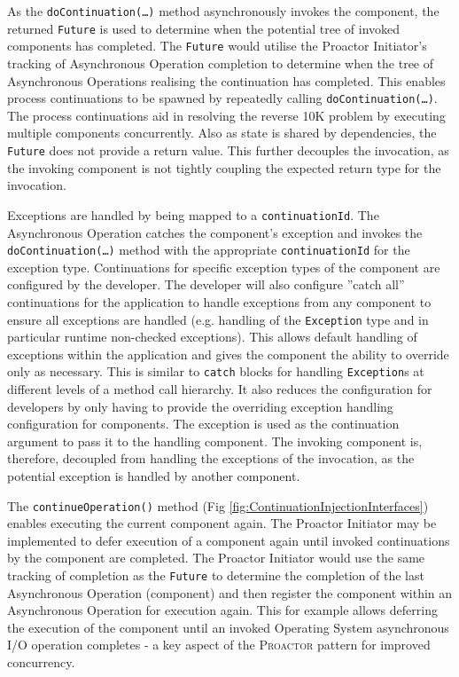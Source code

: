 \documentclass[prodmode]{style/acmlarge}
\begin{document}
As the \texttt{doContinuation(\ldots)} method asynchronously invokes the
component, the returned \texttt{Future} is used to determine when the potential
tree of invoked components has completed.  The \texttt{Future} would utilise the
Proactor Initiator's tracking of Asynchronous Operation completion to determine
when the tree of Asynchronous Operations realising the continuation has
completed.  This enables process continuations \cite{process-continuation} to be
spawned by repeatedly calling \texttt{doContinuation(\ldots)}.  The process
continuations aid in resolving the reverse 10K problem
\cite{reverse-ten-k-problem} by executing multiple components concurrently.
Also as state is shared by dependencies, the \texttt{Future} does not provide a
return value.  This further decouples the invocation, as the invoking component
is not tightly coupling the expected return type for the invocation.

Exceptions are handled by being mapped to a \texttt{continuationId}.  The
Asynchronous Operation catches the component's exception and invokes the
\texttt{doContinuation(\ldots)} method with the appropriate
\texttt{continuationId} for the exception type.  Continuations for specific
exception types of the component are configured by the developer.  The developer
will also configure ''catch all'' continuations for the application to handle
exceptions from any component to ensure all exceptions are handled (e.g.
handling of the \texttt{Exception} type and in particular runtime non-checked
exceptions).  This allows default handling of exceptions within the application
and gives the component the ability to override only as necessary.  This is
similar to \texttt{catch} blocks for handling \texttt{Exception}s at different
levels of a method call hierarchy.  It also reduces the configuration for
developers by only having to provide the overriding exception handling
configuration for components.  The exception is used as the continuation
argument to pass it to the handling component.  The invoking component is,
therefore, decoupled from handling the exceptions of the invocation, as the
potential exception is handled by another component.

The \texttt{continueOperation()} method (Fig
\ref{fig:ContinuationInjectionInterfaces}) enables executing the current
component again.  The Proactor Initiator may be implemented to defer execution
of a component again until invoked continuations by the component are completed.
 The Proactor Initiator would use the same tracking of completion as the
\texttt{Future} to determine the completion of the last Asynchronous Operation
(component) and then register the component within an Asynchronous Operation for
execution again.  This for example allows deferring the execution of the
component until an invoked Operating System asynchronous I/O operation completes
- a key aspect of the \textsc{Proactor} pattern for improved concurrency.
\end{document}
